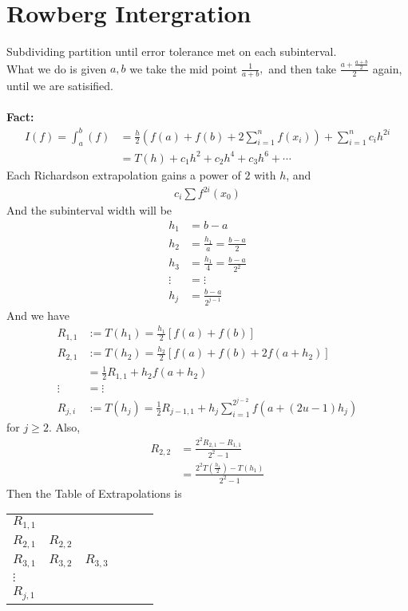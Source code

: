 \documentclass[11pt,oneside]{book}
\theoremstyle{break}
\theoremstyle{break}
\begin{document}
\chapter[Rowberg Integration]{Rowberg Intergration}
Subdividing partition until error tolerance met on each subinterval.\\
What we do is given $a,b$ we take the mid point $\frac{1}{a+b},$ and then take $\frac{a+\frac{a+b}{2}}{2}$ again, until we are satisified.\\
\hfill\\
\textbf{Fact:} \begin{align*}
I(f)=\int_{a}^{b}(f)&=\frac{h}{2}\left(f(a)+f(b)+2\sum_{i=1}^nf(x_i) \right)+\sum_{i=1}^nc_ih^{2i}\\
&=T(h)+c_1h^2+c_2h^4+c_3h^6+\cdots
\end{align*}
Each Richardson extrapolation gains a power of $2$ with $h$, and \begin{align*}
c_i\sum f^{2i}(x_0)
\end{align*}
And the subinterval width will be \begin{align*}
h_1&=b-a\\
h_2&=\frac{h_1}{a}=\frac{b-a}{2}\\
h_3&=\frac{h_1}{4}=\frac{b-a}{2^2}\\
\vdots&=\vdots\\
h_j&=\frac{b-a}{2^{j-1}}
\end{align*}
And we have \begin{align*}
R_{1,1}&:=T(h_1)=\frac{h_1}{2}[f(a)+f(b)]\\
R_{2,1}&:=T(h_2)=\frac{h_2}{2}[f(a)+f(b)+2f(a+h_2)]\\
&=\frac{1}{2}R_{1,1}+h_2f(a+h_2)\\
\vdots&=\vdots\\
R_{j,i}&:=T(h_j)=\frac{1}{2}R_{j-1,1}+h_j\sum_{i=1}^{2^{j-2}}f(a+(2u-1)h_j)
\end{align*}
for $j\geq 2$. Also, \begin{align*}
R_{2,2}&=\frac{2^2R_{2,1}-R_{1,1}}{2^2-1}\\
&=\frac{2^{2}T\left(\frac{h_1}{2} \right)-T(h_1)}{2^2-1}
\end{align*} Then the Table of Extrapolations is \begin{center}
\begin{tabular}{|l|l|l|l|l|l|}
\hline
 &  &  &  &  &  \\ \hline
$R_{1,1}$ &  &  &  &  &  \\ \hline
$R_{2,1}$ & $R_{2,2}$ &  &  &  &  \\ \hline
$R_{3,1}$ & $R_{3,2}$ &$R_{3,3}$  &  &  &  \\ \hline
$\vdots$ &  &  &  &  &  \\ \hline
$R_{j,1}$ &  &  &  &  &  \\ \hline
\end{tabular}
\end{center}
\end{document}
